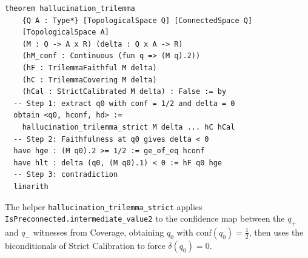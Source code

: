 \documentclass[10pt]{article}
\newcommand{\conf}{\mathrm{conf}}
\begin{document}
\begin{verbatim}
theorem hallucination_trilemma
    {Q A : Type*} [TopologicalSpace Q] [ConnectedSpace Q]
    [TopologicalSpace A]
    (M : Q -> A x R) (delta : Q x A -> R)
    (hM_conf : Continuous (fun q => (M q).2))
    (hF : TrilemmaFaithful M delta)
    (hC : TrilemmaCovering M delta)
    (hCal : StrictCalibrated M delta) : False := by
  -- Step 1: extract q0 with conf = 1/2 and delta = 0
  obtain <q0, hconf, hd> :=
    hallucination_trilemma_strict M delta ... hC hCal
  -- Step 2: Faithfulness at q0 gives delta < 0
  have hge : (M q0).2 >= 1/2 := ge_of_eq hconf
  have hlt : delta (q0, (M q0).1) < 0 := hF q0 hge
  -- Step 3: contradiction
  linarith
\end{verbatim}

The helper \texttt{hallucination\_trilemma\_strict} applies
\texttt{IsPreconnected.intermediate\_value2} to the confidence map between
the $q_+$ and $q_-$ witnesses from Coverage, obtaining $q_0$ with
$\conf(q_0) = \tfrac{1}{2}$, then uses the biconditionals of Strict
Calibration to force $\delta(q_0) = 0$.
\end{document}
